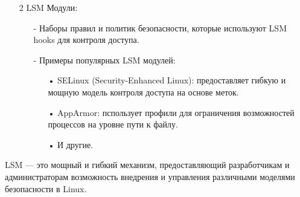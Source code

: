 \begin{flushleft}
\begin{itemize}
		\item[2] LSM Модули:
		\begin{itemize}
			\item[-] Наборы правил и политик безопасности, которые используют LSM hooks для контроля доступа.
			\item[-] Примеры популярных LSM модулей:
				\begin{itemize}
					\item[•] SELinux (Security-Enhanced Linux): предоставляет гибкую и мощную модель контроля доступа на основе меток.
					\item[•] AppArmor: пспользует профили для ограничения возможностей процессов на уровне пути к файлу.
					\item[•] И другие.
				\end{itemize}
		\end{itemize}
	\end{itemize}
	
	LSM — это мощный и гибкий механизм, предоставляющий разработчикам и администраторам возможность внедрения и управления различными моделями безопасности в Linux.
	
\end{flushleft}